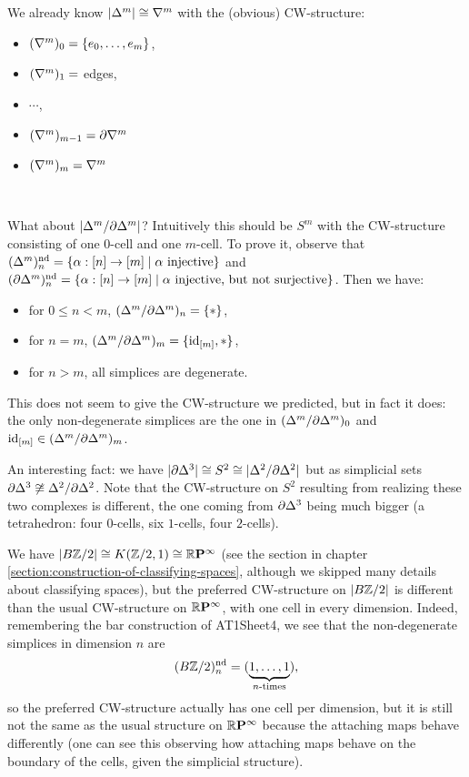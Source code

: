 \begin{example}
We already know $|\Delta^m|\cong\nabla^{m}$ with the (obvious) CW-structure:
\begin{itemize}[label={-}]
    \item $(\nabla^{m})_0=\{{{e}_0,\dots,{e}_{m}}\}$,
    \item $(\nabla^{m})_1=$ edges,
    \item $\cdots$,
    \item $(\nabla^{m})_{m-1}=\partial\nabla^{m}$
    \item $(\nabla^{m})_m=\nabla^{m}$
\end{itemize}\ 

What about $|\Delta^m/\partial\Delta^m|$? Intuitively this should be $S^m$ with the CW-structure consisting of one $0$-cell and one $m$-cell. To prove it, observe that $(\Delta^m)_n^\text{nd}=\{\alpha:[n]\to[m]\mid\alpha\text{ injective}\}$ and $(\partial\Delta^m)_n^\text{nd}=\{\alpha:[n]\to[m]\mid\alpha\text{ injective, but not surjective}\}$. Then we have:
\begin{itemize}[label={-}]
    \item for $0\le n<m$, $(\Delta^m/\partial\Delta^m)_n=\{*\}$,
    \item for $n=m$, $(\Delta^m/\partial\Delta^m)_m=\{\operatorname{id}_{[m]},*\}$,
    \item for $n>m$, all simplices are degenerate.
\end{itemize}
This does not seem to give the CW-structure we predicted, but in fact it does: the only non-degenerate simplices are the one in $(\Delta^m/\partial\Delta^m)_0$ and $\operatorname{id}_{[m]}\in(\Delta^m/\partial\Delta^m)_m$.
\end{example}

\begin{example}
An interesting fact: we have $|\partial\Delta^3|\cong S^2\cong|\Delta^2/\partial\Delta^2|$ but as simplicial sets $\partial\Delta^3\not\cong\Delta^2/\partial\Delta^2$. Note that the CW-structure on $S^2$ resulting from realizing these two complexes is different, the one coming from $\partial\Delta^3$ being much bigger (a tetrahedron: four $0$-cells, six $1$-cells, four $2$-cells).
\end{example}

\begin{example}
We have $|B{\mathbb Z}/2|\cong K({\mathbb Z}/2,1)\cong{{\mathbb R}\mathbf{P}^{\infty}}$ (see the section in chapter \ref{section:construction-of-classifying-spaces}, although we skipped many details about classifying spaces), but the preferred CW-structure on $|B{\mathbb Z}/2|$ is different than the usual CW-structure on ${{\mathbb R}\mathbf{P}^{\infty}}$, with one cell in every dimension. Indeed, remembering the bar construction of AT1Sheet4, we see that the non-degenerate simplices in dimension $n$ are \[(B{\mathbb Z}/2)_n^\text{nd}=(\underbrace{1,\dots,1}_{n\text{-times}}),\] so the preferred CW-structure actually has one cell per dimension, but it is still not the same as the usual structure on ${{\mathbb R}\mathbf{P}^{\infty}}$ because the attaching maps behave differently (one can see this observing how attaching maps behave on the boundary of the cells, given the simplicial structure).
\end{example}

